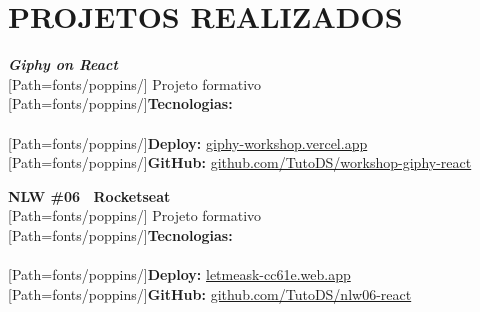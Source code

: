 {\color{primary}\section*{\MakeUppercase{Projetos realizados}}}

\begin{minipage}{.5\textwidth}
\textbf{\textit{Giphy on React}}\\[3pt]
{
	\scriptsize
	[Path=fonts/poppins/]
	Projeto formativo\\[2pt]

	{[Path=fonts/poppins/]\textbf{Tecnologias:}}\\
	  \\[2pt]

	{[Path=fonts/poppins/]\textbf{Deploy:}} \href{https://giphy-workshop.vercel.app}{giphy-workshop.vercel.app}\\
	{[Path=fonts/poppins/]\textbf{GitHub:}} \href{https://github.com/TutoDS/workshop-giphy-react}{github.com/TutoDS/workshop-giphy-react}
}
\end{minipage}
\begin{minipage}{.5\textwidth}
	\textbf{NLW \#06 \textemdash~Rocketseat}\\[3pt]
	{
		\scriptsize
		[Path=fonts/poppins/]
		Projeto formativo\\[2pt]

		{[Path=fonts/poppins/]\textbf{Tecnologias:}}\\
		  \\[2pt]

		{[Path=fonts/poppins/]\textbf{Deploy:}} \href{https://letmeask-cc61e.web.app/}{letmeask-cc61e.web.app}\\
		{[Path=fonts/poppins/]\textbf{GitHub:}} \href{https://github.com/TutoDS/nlw06-react}{github.com/TutoDS/nlw06-react}
	}
\end{minipage}

\vspace{10pt}


